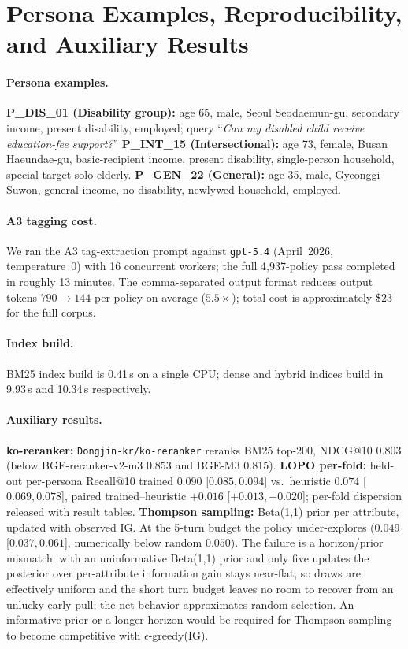 \documentclass{article}
\newcommand{\npolicy}{4{,}937}
\begin{document}
\section{Persona Examples, Reproducibility, and Auxiliary Results}
\label{app:persona}\label{app:repro}

\paragraph{Persona examples.}
\textbf{P\_DIS\_01 (Disability group):} age 65, male, Seoul
Seodaemun-gu, secondary income, present disability, employed; query
``\textit{Can my disabled child receive education-fee support?}''
\textbf{P\_INT\_15 (Intersectional):} age 73, female, Busan
Haeundae-gu, basic-recipient income, present disability,
single-person household, special target solo elderly.
\textbf{P\_GEN\_22 (General):} age 35, male, Gyeonggi Suwon, general
income, no disability, newlywed household, employed.

\paragraph{A3 tagging cost.}
We ran the A3 tag-extraction prompt against \texttt{gpt-5.4}
(April~2026, temperature~0) with 16 concurrent workers; the full
\npolicy{}-policy pass completed in roughly 13 minutes. The
comma-separated output format reduces output tokens
$790\to{}144$ per policy on average ($5.5{\times}$); total cost is
approximately \$23 for the full corpus.

\paragraph{Index build.}
BM25 index build is 0.41\,s on a single CPU; dense and hybrid
indices build in 9.93\,s and 10.34\,s respectively.

\paragraph{Auxiliary results.}
\label{app:auxiliary}\label{app:lopo}\label{app:thompson}%
\textbf{ko-reranker:} \texttt{Dongjin-kr/ko-reranker} reranks BM25
top-200, NDCG@10 $0.803$ (below BGE-reranker-v2-m3 $0.853$ and BGE-M3
$0.815$). \textbf{LOPO per-fold:} held-out per-persona Recall@10
trained $0.090$ [$0.085, 0.094$] vs.\ heuristic $0.074$
[$0.069, 0.078$], paired trained--heuristic $+0.016$
[$+0.013, +0.020$]; per-fold dispersion released with result tables.
\textbf{Thompson sampling:} Beta(1,1) prior per attribute, updated
with observed IG. At the 5-turn budget the policy under-explores
($0.049$ [$0.037, 0.061$], numerically below random $0.050$). The
failure is a horizon/prior mismatch: with an uninformative Beta(1,1)
prior and only five updates the posterior over per-attribute
information gain stays near-flat, so draws are effectively uniform and
the short turn budget leaves no room to recover from an unlucky early
pull; the net behavior approximates random selection. An informative
prior or a longer horizon would be required for Thompson sampling to
become competitive with $\epsilon$-greedy(IG).
\end{document}
